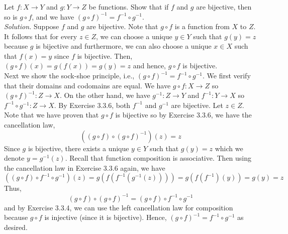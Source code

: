 \documentclass{amsart}
\theoremstyle{definition}
\newcommand{\soln}{\newline\textit{Solution.} }
\begin{document}
\subsubsection{} Let $f:X\to Y$ and $g:Y\to Z$ be functions. Show that if $f$ and $g$ are bijective, then so is $g\circ f$, and we have $(g\circ f)^{-1}=f^{-1}\circ g^{-1}$. \\
\soln Suppose $f$ and $g$ are bijective. Note that $g\circ f$ is a function from $X$ to $Z$. It follows that for every $z\in Z$, we can choose a unique $y\in Y$ such that $g(y)=z$ because $g$ is bijective and furthermore, we can also choose a unique $x\in X$ such that $f(x)=y$ since $f$ is bijective. Then, $(g\circ f)(x)=g(f(x))=g(y)=z$ and hence, $g\circ f$ is bijective. \\

Next we show the sock-shoe principle, i.e., $(g\circ f)^{-1}=f^{-1}\circ g^{-1}$. We first verify that their domains and codomains are equal. We have $g\circ f:X\to Z$ so $(g\circ f)^{-1}:Z\to X$. On the other hand, we have $g^{-1}:Z\to Y$ and $f^{-1}:Y\to X$ so $f^{-1}\circ g^{-1}:Z\to X$. By Exercise 3.3.6, both $f^{-1}$ and $g^{-1}$ are bijective. Let $z\in Z$. Note that we have proven that $g\circ f$ is bijective so by Exercise 3.3.6, we have the cancellation law,
\[
((g\circ f)\circ(g\circ f)^{-1})(z)=z
\]
Since $g$ is bijective, there exists a unique $y\in Y$ such that $g(y)=z$ which we denote $y=g^{-1}(z)$. Recall that function composition is associative. Then using the cancellation law in Exercise 3.3.6 again, we have
\[
((g\circ f)\circ f^{-1}\circ g^{-1})(z)=g(f(f^{-1}(g^{-1}(z))))=g(f(f^{-1})(y))=g(y)=z
\]
Thus,
\[
(g\circ f)\circ(g\circ f)^{-1}=(g\circ f)\circ f^{-1}\circ g^{-1}
\]
and by Exercise 3.3.4, we can use the left cancellation law for composition because $g\circ f$ is injective (since it is bijective). Hence, $(g\circ f)^{-1}=f^{-1}\circ g^{-1}$ as desired. \\
\end{document}
